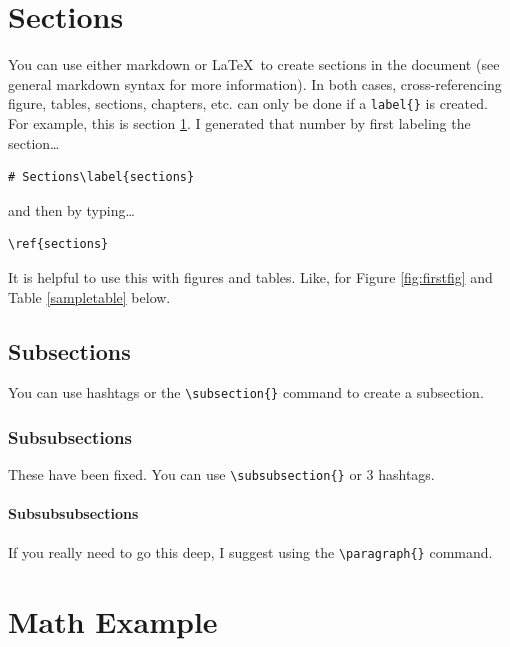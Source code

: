 \documentclass[11pt,report]{uncdissertation}
\let\oldparagraph\paragraph
\renewcommand{\paragraph}[1]{\oldparagraph{#1}\mbox{}}
\begin{document}
\section{\texorpdfstring{Sections\label{sections}}{Sections}}\label{sections}

You can use either markdown or \LaTeX~to create sections in the document
(see general markdown syntax for more information). In both cases,
cross-referencing figure, tables, sections, chapters, etc. can only be
done if a \texttt{label\{\}} is created. For example, this is section
\ref{sections}. I generated that number by first labeling the
section\ldots  

\begin{verbatim}
# Sections\label{sections}
\end{verbatim}

and then by typing\ldots  

\begin{verbatim}
\ref{sections}
\end{verbatim}

It is helpful to use this with figures and tables. Like, for Figure
\ref{fig:firstfig} and Table \ref{sampletable} below.

\subsection{Subsections}\label{subsections}

You can use hashtags or the \texttt{\textbackslash{}subsection\{\}}
command to create a subsection.

\subsubsection{Subsubsections}\label{subsubsections}

These have been fixed. You can use
\texttt{\textbackslash{}subsubsection\{\}} or 3 hashtags.

\paragraph{Subsubsubsections}

If you really need to go this deep, I suggest using the
\texttt{\textbackslash{}paragraph\{\}} command.

\section{\texorpdfstring{Math
Example\label{math}}{Math Example}}\label{math-example}
\end{document}
